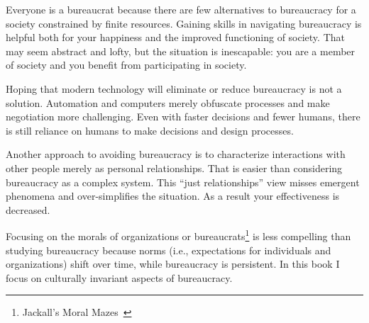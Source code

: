 Everyone is a bureaucrat because there are few alternatives to bureaucracy for a society constrained by finite resources. Gaining skills in navigating bureaucracy is helpful both for your happiness and the improved functioning of society. That may seem abstract and lofty, but the situation is inescapable: you are a member of society and you benefit from participating in society. 

Hoping that modern technology will eliminate or reduce bureaucracy is not a solution. Automation and computers merely obfuscate processes and make negotiation more challenging. Even with faster decisions and fewer humans, there is still reliance on humans to make decisions and design processes.

Another approach to avoiding bureaucracy is to characterize interactions with other people merely as personal relationships. That is easier than considering bureaucracy as a complex system.
This ``just relationships'' view misses emergent phenomena and over-simplifies the situation. As a result your effectiveness is decreased.






Focusing on the morals of organizations or bureaucrats\footnote{Jackall's Moral Mazes~\cite{2009_Jackall}} is less compelling than studying bureaucracy because norms (i.e., expectations for individuals and organizations) shift over time, while bureaucracy is persistent. 
In this book I focus on culturally invariant aspects of bureaucracy. 


